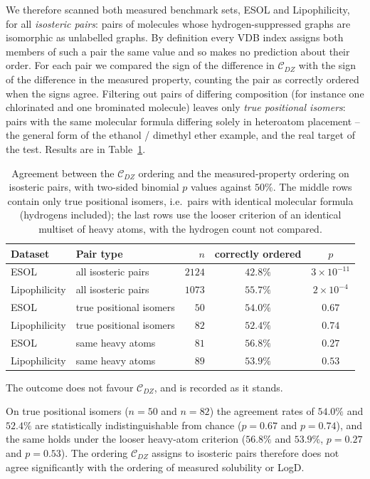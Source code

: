 \documentclass[11pt,a4paper]{article}
\theoremstyle{plain}
\theoremstyle{definition}
\theoremstyle{remark}
\newcommand{\CDZ}{\mathcal{C}_{DZ}}
\begin{document}
We therefore scanned both measured benchmark sets, ESOL and Lipophilicity, for
all \emph{isosteric pairs}: pairs of molecules whose hydrogen-suppressed graphs
are isomorphic as unlabelled graphs. By definition every VDB index assigns both
members of such a pair the same value and so makes no prediction about their
order. For each pair we compared the sign of the difference in $\CDZ$ with the
sign of the difference in the measured property, counting the pair as correctly
ordered when the signs agree. Filtering out pairs of differing composition (for
instance one chlorinated and one brominated molecule) leaves only \emph{true
positional isomers}: pairs with the same molecular formula differing solely in
heteroatom placement -- the general form of the ethanol / dimethyl ether example,
and the real target of the test. Results are in Table~\ref{tab:ranking}.

\begin{table}[htbp]
\centering
\caption{Agreement between the $\CDZ$ ordering and the measured-property ordering
on isosteric pairs, with two-sided binomial $p$ values against $50\%$. The
middle rows contain only true positional isomers, i.e.\ pairs with identical
molecular formula (hydrogens included); the last rows use the looser criterion
of an identical multiset of heavy atoms, with the hydrogen count not compared.}
\label{tab:ranking}
\begin{tabular}{llrcc}
\toprule
Dataset & Pair type & $n$ & correctly ordered & $p$ \\
\midrule
ESOL          & all isosteric pairs     & $2124$ & $42.8\%$ & $3\times10^{-11}$ \\
Lipophilicity & all isosteric pairs     & $1073$ & $55.7\%$ & $2\times10^{-4}$ \\
\midrule
ESOL          & true positional isomers & $50$   & $54.0\%$ & $0.67$ \\
Lipophilicity & true positional isomers & $82$   & $52.4\%$ & $0.74$ \\
\midrule
ESOL          & same heavy atoms        & $81$   & $56.8\%$ & $0.27$ \\
Lipophilicity & same heavy atoms        & $89$   & $53.9\%$ & $0.53$ \\
\bottomrule
\end{tabular}
\end{table}

The outcome does not favour $\CDZ$, and is recorded as it stands.

On true positional isomers ($n=50$ and $n=82$) the agreement rates of $54.0\%$
and $52.4\%$ are statistically indistinguishable from chance ($p=0.67$ and
$p=0.74$), and the same holds under the looser heavy-atom criterion ($56.8\%$
and $53.9\%$, $p=0.27$ and $p=0.53$). The ordering $\CDZ$ assigns to isosteric pairs therefore does not
agree significantly with the ordering of measured solubility or LogD.
\end{document}
